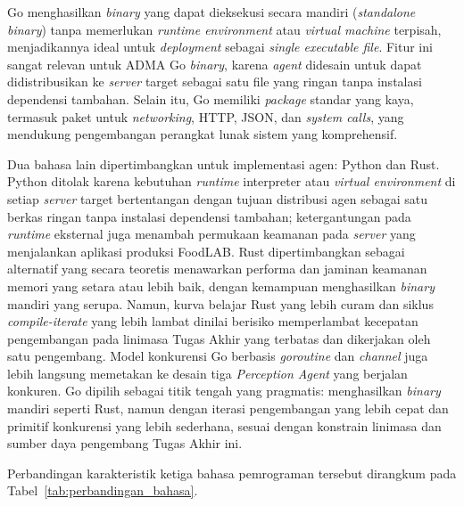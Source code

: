 Go menghasilkan \textit{binary} yang dapat dieksekusi secara mandiri (\textit{standalone binary}) tanpa memerlukan \textit{runtime environment} atau \textit{virtual machine} terpisah, menjadikannya ideal untuk \textit{deployment} sebagai \textit{single executable file}. Fitur ini sangat relevan untuk ADMA Go \textit{binary}, karena \textit{agent} didesain untuk dapat didistribusikan ke \textit{server} target sebagai satu file yang ringan tanpa instalasi dependensi tambahan. Selain itu, Go memiliki \textit{package} standar yang kaya, termasuk paket untuk \textit{networking}, HTTP, JSON, dan \textit{system calls}, yang mendukung pengembangan perangkat lunak sistem yang komprehensif.

Dua bahasa lain dipertimbangkan untuk implementasi agen: Python dan Rust. Python ditolak karena kebutuhan \textit{runtime} interpreter atau \textit{virtual environment} di setiap \textit{server} target bertentangan dengan tujuan distribusi agen sebagai satu berkas ringan tanpa instalasi dependensi tambahan; ketergantungan pada \textit{runtime} eksternal juga menambah permukaan keamanan pada \textit{server} yang menjalankan aplikasi produksi FoodLAB. Rust dipertimbangkan sebagai alternatif yang secara teoretis menawarkan performa dan jaminan keamanan memori yang setara atau lebih baik, dengan kemampuan menghasilkan \textit{binary} mandiri yang serupa. Namun, kurva belajar Rust yang lebih curam dan siklus \textit{compile-iterate} yang lebih lambat dinilai berisiko memperlambat kecepatan pengembangan pada linimasa Tugas Akhir yang terbatas dan dikerjakan oleh satu pengembang. Model konkurensi Go berbasis \textit{goroutine} dan \textit{channel} juga lebih langsung memetakan ke desain tiga \textit{Perception Agent} yang berjalan konkuren. Go dipilih sebagai titik tengah yang pragmatis: menghasilkan \textit{binary} mandiri seperti Rust, namun dengan iterasi pengembangan yang lebih cepat dan primitif konkurensi yang lebih sederhana, sesuai dengan konstrain linimasa dan sumber daya pengembang Tugas Akhir ini.

Perbandingan karakteristik ketiga bahasa pemrograman tersebut dirangkum pada Tabel~\ref{tab:perbandingan_bahasa}.

